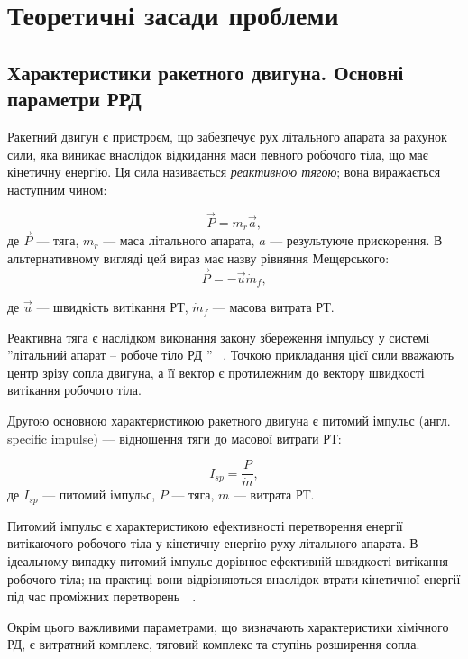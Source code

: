 
\chapter{Теоретичні засади проблеми}\label{sec:First}

\section{Характеристики ракетного двигуна. Основні параметри РРД}

Ракетний двигун є пристроєм, що забезпечує рух літального апарата за рахунок сили, яка виникає внаслідок відкидання маси певного робочого тіла, що має кінетичну енергію. Ця сила називається \emph{реактивною тягою}; вона виражається наступним чином:

\begin{equation*}
	\vec{P} =m_{r}\vec{a} ,
\end{equation*}
де $\vec{P}$ --- тяга, $m_r$ --- маса літального апарата, $a$ --- результуюче прискорення. В альтернативному вигляді цей вираз має назву рівняння Мещерського:
\begin{equation*}
	\vec{P} = - \vec{u} \dot{m}_f,
\end{equation*}

де $\vec u$ ---  швидкість витікання РТ, $\dot{m}_f$ --- масова витрата РТ.

Реактивна тяга є наслідком виконання закону збереження імпульсу у системі ''літальний апарат -- робоче тіло РД '' ~\cite{Sivuhin}. Точкою прикладання цієї сили вважають центр зрізу сопла двигуна, а її вектор є протилежним до вектору швидкості витікання робочого тіла.

Другою основною характеристикою ракетного двигуна є питомий імпульс (англ. specific impulse) --- відношення тяги до масової витрати РТ:

\begin{equation*}
    I_{sp} = \frac{P}{\dot{m}},
\end{equation*}
де  $I_{sp}$ ---  питомий імпульс, $P$ ---  тяга, $m$ --- витрата РТ. 

Питомий імпульс є характеристикою ефективності перетворення енергії витікаючого робочого тіла у кінетичну енергію руху літального апарата. В ідеальному випадку питомий імпульс дорівнює ефективній швидкості витікання робочого тіла; на практиці вони відрізняються внаслідок втрати кінетичної енергії під час проміжних перетворень~\cite[с. 16 -- 23]{Alemasov}~\cite[с. 53]{Sutton}. 

Окрім цього важливими параметрами, що визначають характеристики хімічного РД, є витратний комплекс, тяговий комплекс та ступінь розширення сопла.

